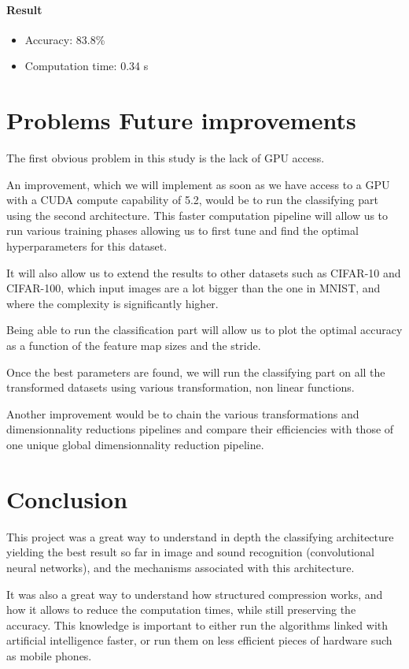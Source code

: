 \documentclass[11pt,a4paper]{article}
\begin{document}
		\paragraph{Result}
		\begin{itemize}
			\item Accuracy: 83.8\%
			\item Computation time: 0.34 s
		\end{itemize}
		
		
	
	
	\section{Problems Future improvements}
	The first obvious problem in this study is the lack of GPU access.
	
	
	An improvement, which we will implement as soon as we have access to a GPU with a CUDA compute capability of 5.2, would be to run the classifying part using the second architecture.
	This faster computation pipeline will allow us to run various training phases allowing us to first tune and find the optimal hyperparameters for this dataset.
	
	
	It will also allow us to extend the results to other datasets such as CIFAR-10 and CIFAR-100, which input images are a lot bigger than the one in MNIST, and where the complexity is significantly higher.
	
	
	Being able to run the classification part will allow us to plot the optimal accuracy as a function of the feature map sizes and the stride.
	
	
Once the best parameters are found, we will run the classifying part on all the transformed datasets using various transformation, non linear functions.
	
	Another improvement would be to chain the various transformations and dimensionnality reductions pipelines and compare their efficiencies with those of one unique global dimensionnality reduction pipeline.
	
	
	\section{Conclusion}
This project was a great way to understand in depth the classifying architecture yielding the best result so far in image and sound recognition (convolutional neural networks), and the mechanisms associated with this architecture.

It was also a great way to understand how structured compression works, and how it allows to reduce the computation times, while still preserving the accuracy. This knowledge is important to either run the algorithms linked with artificial intelligence faster, or run them on less efficient pieces of hardware such as mobile phones.
\end{document}
